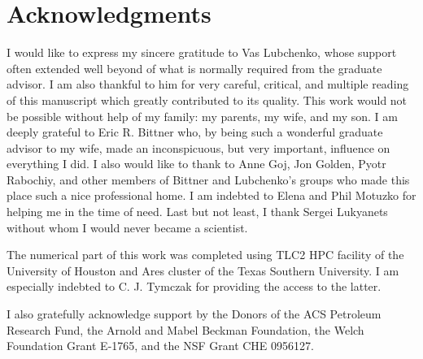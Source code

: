 \begingroup
\let\clearpage\relax
\let\cleardoublepage\relax
\let\cleardoublepage\relax
\chapter*{Acknowledgments}
I would like to express my sincere gratitude to Vas Lubchenko, whose
support often extended well beyond of what is normally required from
the graduate advisor. I am also thankful to him for very careful,
critical, and multiple reading of this manuscript which greatly
contributed to its quality.  This work would not be possible without
help of my family: my parents, my wife, and my son.  I am
deeply grateful to Eric R. Bittner who, by being such a wonderful
graduate advisor to my wife, made an inconspicuous, but very important,
influence on everything I did. I also would like to thank to Anne Goj,
Jon Golden, Pyotr Rabochiy, and other members of Bittner and
Lubchenko's groups who made this place such a nice professional
home. I am indebted to Elena and Phil Motuzko for helping me in the
time of need. Last but not least, I thank Sergei Lukyanets without
whom I would never became a scientist.

The numerical part of this work was completed using TLC2 HPC
facility of the University of Houston and Ares cluster of the Texas
Southern University. I am especially indebted to C. J. Tymczak for
providing the access to the latter.

I also gratefully acknowledge support by the Donors of the ACS Petroleum
Research Fund, the Arnold and Mabel Beckman Foundation, the Welch
Foundation Grant E-1765, and the NSF Grant CHE 0956127.
\endgroup



